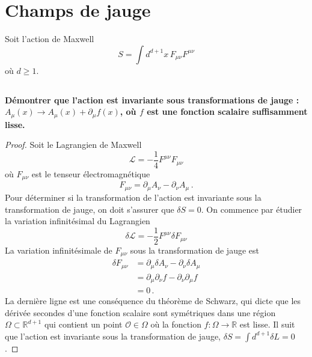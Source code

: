 \documentclass{article}
\numberwithin{equation}{section}
\theoremstyle{solution}
\begin{document}
\section{Champs de jauge}
Soit l'action de Maxwell
\begin{equation}\label{eq:MaxwellAction}
       S = \int d^{d+1}x\, F_{\mu\nu}F^{\mu\nu}
\end{equation} 
où $d \geq 1$.
\subsection{}
\textbf{Démontrer que l’action est invariante sous transformations de jauge : $A_{\mu}(x) \rightarrow A_{\mu}(x) +
\partial_{\mu}f(x)$, où $f$ est une fonction scalaire suffisamment lisse.}
\vspace{2ex}

\begin{proof}
Soit le Lagrangien de Maxwell
\begin{equation}
        \mathcal{L} = -\frac{1}{4}F^{\mu \nu}F_{\mu\nu} %
\end{equation} 
où $F_{\mu\nu}$ est le tenseur électromagnétique %
\begin{equation}\label{eq:F}
        F_{\mu\nu} = \partial_{\mu}A_\nu - \partial_{\nu}A_\mu\, .
\end{equation} 
Pour déterminer si la transformation de l'action est invariante sous la transformation de jauge, on doit s'assurer que $\delta S = 0$.
On commence par étudier la variation infinitésimal du Lagrangien
\begin{equation}
        \delta \mathcal{L} = -\frac{1}{2}F^{\mu \nu} \delta F_{\mu \nu}
\end{equation} 
La variation infinitésimale de $F_{\mu \nu}$ sous la transformation de jauge est
\begin{align*}
        \delta F_{\mu \nu} &= \partial_{\mu}\delta A_{\nu} - \partial_{\nu} \delta A_\mu \\
        &= \partial_{\mu}\partial_\nu f - \partial_{\nu} \partial_\mu f \\
        &= 0\, .
\end{align*}
La dernière ligne est une conséquence du théorème de Schwarz, qui dicte que les dérivée secondes d'une fonction scalaire sont symétriques dans une région $\Omega \subset \mathbb{R}^{d+1}$ qui 
contient un point $\mathcal{O} \in \Omega$ où la fonction $f:\Omega \rightarrow \mathbb{R}$ est lisse. Il suit que l'action est invariante sous la transformation de jauge, 
$\delta S = \int d^{d+1} \delta L = 0$.
\end{proof}
\end{document}
